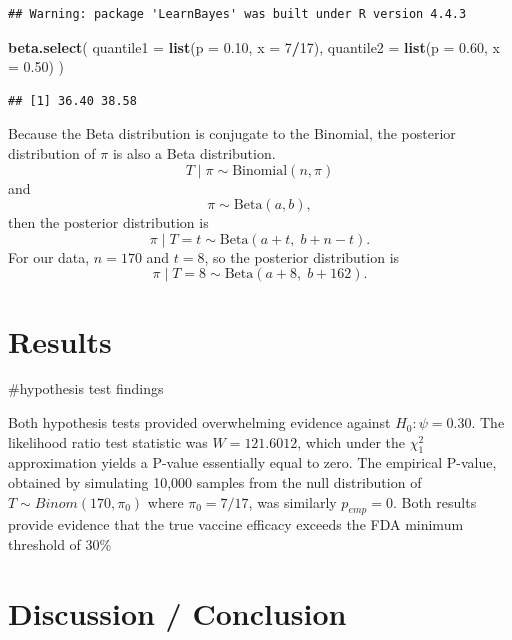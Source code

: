 \documentclass[
  11pt,
]{article}
\newenvironment{Shaded}{\begin{snugshade}}{\end{snugshade}}
\newcommand{\AttributeTok}[1]{\textcolor[rgb]{0.13,0.29,0.53}{#1}}
\newcommand{\DecValTok}[1]{\textcolor[rgb]{0.00,0.00,0.81}{#1}}
\newcommand{\FloatTok}[1]{\textcolor[rgb]{0.00,0.00,0.81}{#1}}
\newcommand{\FunctionTok}[1]{\textcolor[rgb]{0.13,0.29,0.53}{\textbf{#1}}}
\newcommand{\NormalTok}[1]{#1}
\newcommand{\SpecialCharTok}[1]{\textcolor[rgb]{0.81,0.36,0.00}{\textbf{#1}}}
\begin{document}
\begin{verbatim}
## Warning: package 'LearnBayes' was built under R version 4.4.3
\end{verbatim}

\begin{Shaded}
\begin{Highlighting}[]
\FunctionTok{beta.select}\NormalTok{(}
  \AttributeTok{quantile1 =} \FunctionTok{list}\NormalTok{(}\AttributeTok{p =} \FloatTok{0.10}\NormalTok{, }\AttributeTok{x =} \DecValTok{7}\SpecialCharTok{/}\DecValTok{17}\NormalTok{),}
  \AttributeTok{quantile2 =} \FunctionTok{list}\NormalTok{(}\AttributeTok{p =} \FloatTok{0.60}\NormalTok{, }\AttributeTok{x =} \FloatTok{0.50}\NormalTok{)}
\NormalTok{)}
\end{Highlighting}
\end{Shaded}

\begin{verbatim}
## [1] 36.40 38.58
\end{verbatim}

Because the Beta distribution is conjugate to the Binomial, the
posterior distribution of \(\pi\) is also a Beta distribution. \[
T \mid \pi \sim \text{Binomial}(n,\pi)
\] and \[
\pi \sim \text{Beta}(a,b),
\] then the posterior distribution is \[
\pi \mid T=t \sim \text{Beta}(a+t,\; b+n-t).
\] For our data, \(n=170\) and \(t=8\), so the posterior distribution is
\[
\pi \mid T=8 \sim \text{Beta}(a+8,\; b+162).
\]

\section{Results}\label{results}

\#hypothesis test findings

Both hypothesis tests provided overwhelming evidence against
\(H_0: \psi = 0.30\). The likelihood ratio test statistic was
\(W = 121.6012\), which under the \(\chi^2_1\) approximation yields a
P-value essentially equal to zero. The empirical P-value, obtained by
simulating 10,000 samples from the null distribution of
\(T \sim Binom(170, \pi_0)\) where \(\pi_0 = 7/17\), was similarly
\(p_{emp} = 0\). Both results provide evidence that the true vaccine
efficacy exceeds the FDA minimum threshold of 30\%

\section{Discussion / Conclusion}\label{discussion-conclusion}
\end{document}
